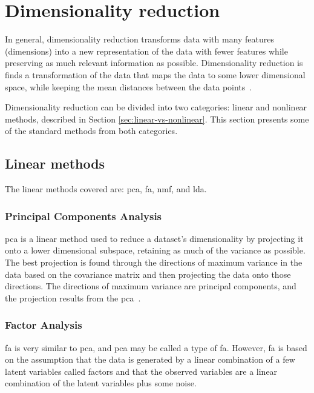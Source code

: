 \section{Dimensionality reduction}\label{sec:dimensionality-reduction}
In general, dimensionality reduction transforms data with many features (dimensions) into a new representation of the data with fewer features while preserving as much relevant information as possible. Dimensionality reduction is finds a transformation of the data that maps the data to some lower dimensional space, while keeping the mean distances between the data points~\cite{dimensionality-reduction-comparative-review}.

Dimensionality reduction can be divided into two categories: linear and nonlinear methods, described in Section \ref{sec:linear-vs-nonlinear}. This section presents some of the standard methods from both categories.


\subsection{Linear methods}\label{subsec:linear-methods}
The linear methods covered are: \gls{pca}, \gls{fa}, \gls{nmf}, and \gls{lda}.


\subsubsection{Principal Components Analysis}\label{subsubsec:principal-components-analysis}
\gls{pca} is a linear method used to reduce a dataset's dimensionality by projecting it onto a lower dimensional subspace, retaining as much of the variance as possible. The best projection is found through the directions of maximum variance in the data based on the covariance matrix and then projecting the data onto those directions. The directions of maximum variance are principal components, and the projection results from the \gls{pca}~\cite{dimensionality-reduction-comparative-review}.


\subsubsection{Factor Analysis}\label{subsubsec:factor-analysis}
\gls{fa} is very similar to \gls{pca}, and \gls{pca} may be called a type of \gls{fa}. However, \gls{fa} is based on the assumption that the data is generated by a linear combination of a few latent variables called factors and that the observed variables are a linear combination of the latent variables plus some noise.

